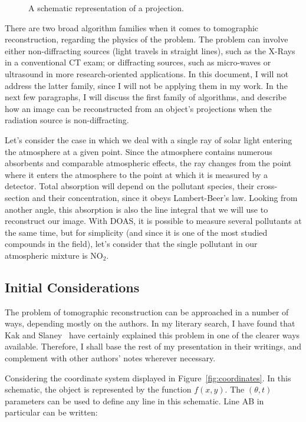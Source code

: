\begin{figure}[htpb]
    \centering
    \caption{A schematic representation of a projection.}
    \label{fig:projection}
\end{figure}

There are two broad algorithm families when it comes to tomographic
reconstruction, regarding the physics of the problem. The problem can
involve either non-diffracting sources (light travels in straight
lines), such as the X-Rays in a conventional \gls{CT} exam; or
diffracting sources, such as micro-waves or ultrasound in more
research-oriented applications. In this document, I will not address the
latter family, since I will not be applying them in my work. In the next
few paragraphs, I will discuss the first family of algorithms, and
describe how an image can be reconstructed from an object's projections
when the radiation source is non-diffracting.

Let's consider the case in which we deal with a single ray of solar
light entering the atmosphere at a given point. Since the atmosphere
contains numerous absorbents and comparable atmospheric effects, the ray
changes from the point where it enters the atmosphere to the point at
which it is measured by a detector. Total absorption will depend on the
pollutant species, their cross-section and their concentration, since it
obeys Lambert-Beer's law. Looking from another angle, this absorption
is also the line integral that we will use to reconstruct our image.
With \gls{DOAS}, it is possible to measure several pollutants at the
same time, but for simplicity (and since it is one of the most studied
compounds in the field), let's consider that the single pollutant in our
atmospheric mixture is NO$_2$.

\subsection{Initial Considerations}%
\label{sub:initial_considerations}

The problem of tomographic reconstruction can be approached in a number
of ways, depending mostly on the authors. In my literary search, I have
found that Kak and Slaney~\cite{Kak2001} have certainly explained this
problem in one of the clearer ways available. Therefore, I shall base
the rest of my presentation in their writings, and complement with other
authors' notes wherever necessary.

Considering the coordinate system displayed in
Figure~\ref{fig:coordinates}. In this schematic, the object is
represented by the function $f(x, y)$. The  $(\theta, t)$ parameters can
be used to define any line in this schematic. Line AB in particular can
be written:

